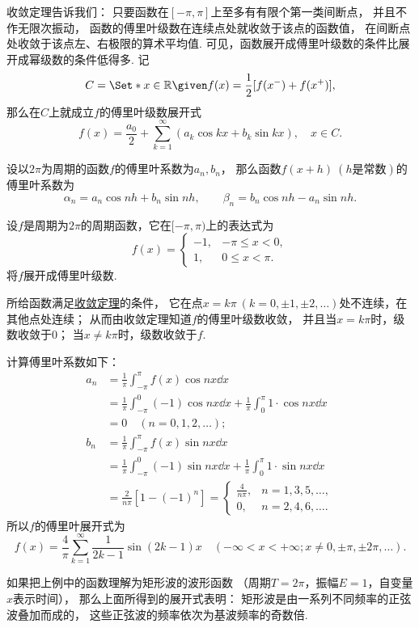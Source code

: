 收敛定理告诉我们：
只要函数在\([-\pi,\pi]\)上至多有有限个第一类间断点，
并且不作无限次振动，
函数的傅里叶级数在连续点处就收敛于该点的函数值，
在间断点处收敛于该点左、右极限的算术平均值.
可见，函数展开成傅里叶级数的条件比展开成幂级数的条件低得多.
记
\begin{equation}
	C = \Set*{
		x \in \mathbb{R}
		\given
		f(x) = \frac{1}{2} [ f(x^-) + f(x^+) ]
	},
\end{equation}
那么在\(C\)上就成立\(f\)的傅里叶级数展开式\[
	f(x) = \frac{a_0}{2} + \sum_{k=1}^\infty (a_k \cos{kx} + b_k \sin kx),
	\quad x \in C.
\]

\begin{theorem}
设以\(2\pi\)为周期的函数\(f\)的傅里叶系数为\(a_n,b_n\)，
那么函数\(f(x+h)\ (h\text{是常数})\)的傅里叶系数为\[
	\alpha_n
	= a_n \cos nh + b_n \sin nh,
	\qquad
	\beta_n
	= b_n \cos nh - a_n \sin nh.
\]
\end{theorem}

\begin{example}[矩形波的谐波分析]
设\(f\)是周期为\(2\pi\)的周期函数，它在\([-\pi,\pi)\)上的表达式为\[
	f(x) = \left\{ \begin{array}{cc}
		-1, & -\pi \leq x < 0, \\
		1, & 0 \leq x < \pi.
	\end{array} \right.
\]将\(f\)展开成傅里叶级数.
\begin{solution}
所给函数满足\hyperref[theorem:无穷级数.傅里叶级数收敛的狄利克雷充分条件]{收敛定理}的条件，
它在点\(x = k\pi\ (k=0,\pm1,\pm2,\dotsc)\)处不连续，在其他点处连续；
从而由收敛定理知道\(f\)的傅里叶级数收敛，
并且当\(x = k\pi\)时，级数收敛于\(0\)；
当\(x \neq k\pi\)时，级数收敛于\(f\).

计算傅里叶系数如下：
\begin{align*}
	a_n &= \frac{1}{\pi} \int_{-\pi}^\pi f(x) \cos nx \dd{x} \\
		&= \frac{1}{\pi} \int_{-\pi}^0 (-1) \cos nx \dd{x}
			+ \frac{1}{\pi} \int_0^\pi 1 \cdot \cos nx \dd{x} \\
		&= 0 \quad(n=0,1,2,\dotsc); \\
	b_n &= \frac{1}{\pi} \int_{-\pi}^\pi f(x) \sin nx \dd{x} \\
		&= \frac{1}{\pi} \int_{-\pi}^0 (-1) \sin nx \dd{x}
			+ \frac{1}{\pi} \int_0^\pi 1 \cdot \sin nx \dd{x} \\
		&= \frac{2}{n\pi} [1-(-1)^n]
		= \left\{ \begin{array}{cl}
			\frac{4}{n\pi}, & n=1,3,5,\dotsc, \\
			0, & n=2,4,6,\dotsc.
		\end{array} \right.
\end{align*}
所以\(f\)的傅里叶展开式为\[
	f(x) = \frac{4}{\pi} \sum_{k=1}^\infty \frac{1}{2k-1} \sin(2k-1) x
	\quad(-\infty<x<+\infty;x\neq0,\pm\pi,\pm2\pi,\dotsc).
\]
\end{solution}
\end{example}
如果把上例中的函数理解为矩形波的波形函数%
（周期\(T=2\pi\)，振幅\(E=1\)，自变量\(x\)表示时间），
那么上面所得到的展开式表明：
矩形波是由一系列不同频率的正弦波叠加而成的，
这些正弦波的频率依次为基波频率的奇数倍.

